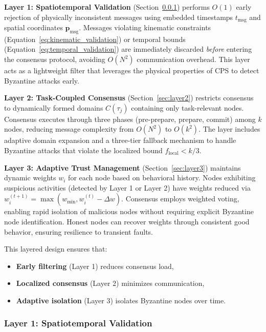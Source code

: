 \documentclass[lettersize,journal]{IEEEtran}
\begin{document}
\textbf{Layer 1: Spatiotemporal Validation} (Section~\ref{sec:layer1}) performs $O(1)$ early rejection of physically inconsistent messages using embedded timestamps $t_{\text{msg}}$ and spatial coordinates $\mathbf{p}_{\text{msg}}$. Messages violating kinematic constraints (Equation~\ref{eq:kinematic_validation}) or temporal bounds (Equation~\ref{eq:temporal_validation}) are immediately discarded \textit{before} entering the consensus protocol, avoiding $O(N^2)$ communication overhead. This layer acts as a lightweight filter that leverages the physical properties of CPS to detect Byzantine attacks early.

\textbf{Layer 2: Task-Coupled Consensus} (Section~\ref{sec:layer2}) restricts consensus to dynamically
formed domains $C(\tau_j)$ containing only task-relevant nodes.
Consensus executes through three phases (pre-prepare, prepare, commit) among
$k$ nodes, reducing message complexity from $O(N^2)$ to $O(k^2)$. The layer includes adaptive domain expansion and a three-tier fallback mechanism to handle Byzantine attacks that violate the localized bound $f_{\text{local}} < k/3$.

\textbf{Layer 3: Adaptive Trust Management} (Section~\ref{sec:layer3}) maintains dynamic weights $w_i$ for each node based on behavioral history. Nodes exhibiting suspicious activities (detected by Layer 1 or Layer 2) have weights reduced via $w_i^{(t+1)} = \max(w_{\min}, w_i^{(t)} - \Delta w)$. Consensus employs weighted voting, enabling rapid isolation of malicious nodes without requiring explicit Byzantine node identification. Honest nodes can recover weights through consistent good behavior, ensuring resilience to transient faults.

This layered design ensures that:
\begin{itemize}
\item \textbf{Early filtering} (Layer 1) reduces consensus load,
\item \textbf{Localized consensus} (Layer 2) minimizes communication,
\item \textbf{Adaptive isolation} (Layer 3) isolates Byzantine nodes over time.
\end{itemize}

\subsubsection{Layer 1: Spatiotemporal Validation}
\label{sec:layer1}
\end{document}

